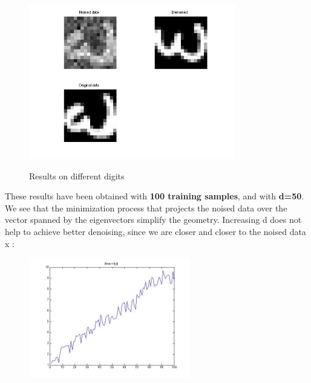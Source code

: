 \begin{figure}[H]
	\subcaption{}\label{fig:awesome_image3}
	\endminipage \hfill
	\includegraphics[width=9cm]{result3.jpg}
	\subcaption{}\label{fig:awesome_image4}
	\endminipage
	\caption{Results on different digits}
\end{figure} 
These results have been obtained with \textbf{100 training samples}, and with \textbf{d=50}. We see that the minimization process that projects the noised data over the vector spanned by the eigenvectors simplify the geometry. Increasing d does not help to achieve better denoising, since we  are closer and closer to the noised data x :

\begin{figure}[H]
	\includegraphics[width=7cm]{plotError.jpg}
	\label{fig:awesome_image5}
	\endminipage\hfill
\end{figure}


